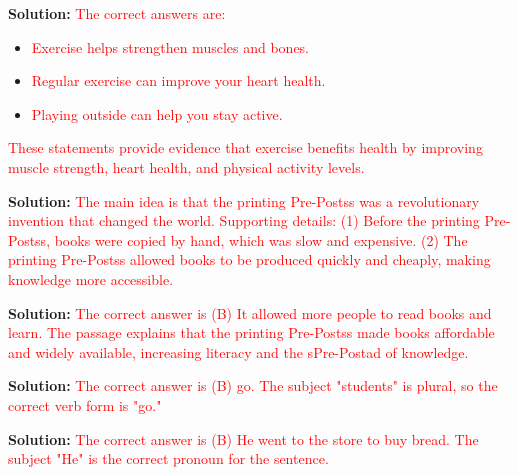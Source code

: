 \documentclass[12pt]{article}
\begin{document}
\begin{tcolorbox}[colframe=black!50, colback=white, title=Question 5]
\textbf{Solution:} \textcolor{red}{The correct answers are:}
\begin{itemize}
    \item \textcolor{red}{Exercise helps strengthen muscles and bones.}
    \item \textcolor{red}{Regular exercise can improve your heart health.}
    \item \textcolor{red}{Playing outside can help you stay active.}
\end{itemize}
\textcolor{red}{These statements provide evidence that exercise benefits health by improving muscle strength, heart health, and physical activity levels.}
\end{tcolorbox}

\begin{tcolorbox}[colframe=black!50, colback=white, title=Question 6]
\textbf{Solution:} \textcolor{red}{The main idea is that the printing Pre-Postss was a revolutionary invention that changed the world. Supporting details: (1) Before the printing Pre-Postss, books were copied by hand, which was slow and expensive. (2) The printing Pre-Postss allowed books to be produced quickly and cheaply, making knowledge more accessible.}
\end{tcolorbox}

\begin{tcolorbox}[colframe=black!50, colback=white, title=Question 7]
\textbf{Solution:} \textcolor{red}{The correct answer is (B) It allowed more people to read books and learn. The passage explains that the printing Pre-Postss made books affordable and widely available, increasing literacy and the sPre-Postad of knowledge.}
\end{tcolorbox}

\begin{tcolorbox}[colframe=black!50, colback=white, title=Question 8]
\textbf{Solution:} \textcolor{red}{The correct answer is (B) go. The subject "students" is plural, so the correct verb form is "go."}
\end{tcolorbox}

\begin{tcolorbox}[colframe=black!50, colback=white, title=Question 9]
\textbf{Solution:} \textcolor{red}{The correct answer is (B) He went to the store to buy bread. The subject "He" is the correct pronoun for the sentence.}
\end{tcolorbox}
\end{document}
